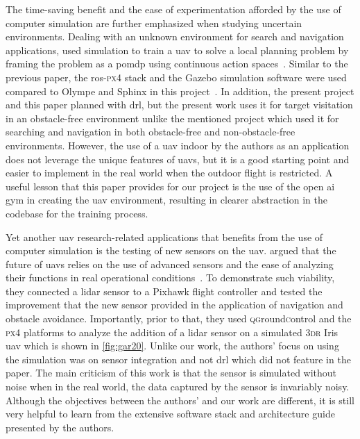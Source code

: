 \documentclass[../main.tex]{subfiles}
\begin{document}
The time-saving benefit and the ease of experimentation 
afforded by the use of computer simulation are further emphasized 
when studying uncertain environments.
Dealing with an unknown environment for search and navigation applications,
\citeauthor{Wal19} used simulation to train a \gls{uav}
to solve a local planning problem
by framing the problem as 
a \gls{pomdp}
using continuous action spaces~\cite{Wal19}.
Similar to the previous paper, the \gls{ros}-\textsc{px4} stack 
and the Gazebo 
simulation software were used compared to Olympe and Sphinx 
in this project~\cite{Wal19}.
In addition, the present project and this paper planned with \gls{drl}, but the present work uses it for target visitation 
in an obstacle-free environment 
unlike the mentioned project which used it for searching and navigation
in both obstacle-free and non-obstacle-free environments.
However, the use of a \gls{uav} indoor by the authors as an application 
does not leverage the unique features of \glspl{uav}, 
but it is a good starting point 
and easier to implement in the real world 
when the outdoor flight is restricted.
A useful lesson that this paper provides for our project
is the use of the open \gls{ai} gym in creating the \gls{uav} environment,
resulting in clearer abstraction in the codebase
for the training process.

Yet another \gls{uav} research-related applications 
that benefits from the use of computer simulation 
is the testing of new sensors on the \gls{uav}.
\citeauthor{Gar20} argued that the future of \glspl{uav}
relies on the use of advanced sensors and 
the ease of analyzing their functions
in real operational conditions~\cite{Gar20}.
To demonstrate such viability, they connected a \gls{lidar} sensor
to a Pixhawk flight controller and tested the improvement
that the new sensor provided
in the application of navigation and obstacle avoidance.
Importantly, prior to that, they used \textsc{qg}round\textsc{c}ontrol and the \textsc{px}4
platforms to analyze the addition of a \gls{lidar} sensor
on a simulated 3\textsc{dr} Iris \gls{uav} which is shown
in \cref{fig:gar20}.
Unlike our work, the authors' focus on using the simulation
was on sensor integration and not \gls{drl} 
which did not feature in the paper. 
The main criticism of this work is that 
the sensor is simulated without noise
when in the real world, the data captured
by the sensor is invariably noisy.
Although the objectives between the authors' and our work
are different, it is still very helpful to learn from
the extensive software stack and architecture guide 
presented by the authors.
\end{document}
